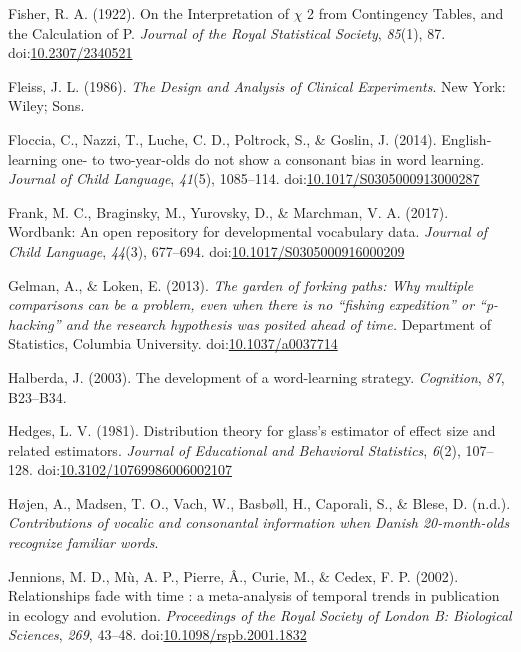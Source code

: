 \documentclass[man]{apa6}
\begin{document}
\leavevmode\hypertarget{ref-Fisher1922}{}%
Fisher, R. A. (1922). On the Interpretation of \(\chi\) 2 from Contingency Tables, and the Calculation of P. \emph{Journal of the Royal Statistical Society}, \emph{85}(1), 87. doi:\href{https://doi.org/10.2307/2340521}{10.2307/2340521}

\leavevmode\hypertarget{ref-Fleiss1986}{}%
Fleiss, J. L. (1986). \emph{The Design and Analysis of Clinical Experiments}. New York: Wiley; Sons.

\leavevmode\hypertarget{ref-Floccia2014}{}%
Floccia, C., Nazzi, T., Luche, C. D., Poltrock, S., \& Goslin, J. (2014). English-learning one- to two-year-olds do not show a consonant bias in word learning. \emph{Journal of Child Language}, \emph{41}(5), 1085--114. doi:\href{https://doi.org/10.1017/S0305000913000287}{10.1017/S0305000913000287}

\leavevmode\hypertarget{ref-Frank2017}{}%
Frank, M. C., Braginsky, M., Yurovsky, D., \& Marchman, V. A. (2017). Wordbank: An open repository for developmental vocabulary data. \emph{Journal of Child Language}, \emph{44}(3), 677--694. doi:\href{https://doi.org/10.1017/S0305000916000209}{10.1017/S0305000916000209}

\leavevmode\hypertarget{ref-Gelman2013}{}%
Gelman, A., \& Loken, E. (2013). \emph{The garden of forking paths: Why multiple comparisons can be a problem, even when there is no ``fishing expedition'' or ``p-hacking'' and the research hypothesis was posited ahead of time.} Department of Statistics, Columbia University. doi:\href{https://doi.org/10.1037/a0037714}{10.1037/a0037714}

\leavevmode\hypertarget{ref-Halberda2003}{}%
Halberda, J. (2003). The development of a word-learning strategy. \emph{Cognition}, \emph{87}, B23--B34.

\leavevmode\hypertarget{ref-Hedges1981}{}%
Hedges, L. V. (1981). Distribution theory for glass's estimator of effect size and related estimators. \emph{Journal of Educational and Behavioral Statistics}, \emph{6}(2), 107--128. doi:\href{https://doi.org/10.3102/10769986006002107}{10.3102/10769986006002107}

\leavevmode\hypertarget{ref-Hojen}{}%
Højen, A., Madsen, T. O., Vach, W., Basbøll, H., Caporali, S., \& Blese, D. (n.d.). \emph{Contributions of vocalic and consonantal information when Danish 20-month-olds recognize familiar words}.

\leavevmode\hypertarget{ref-Jennions2002}{}%
Jennions, M. D., Mù, A. P., Pierre, Â., Curie, M., \& Cedex, F. P. (2002). Relationships fade with time : a meta-analysis of temporal trends in publication in ecology and evolution. \emph{Proceedings of the Royal Society of London B: Biological Sciences}, \emph{269}, 43--48. doi:\href{https://doi.org/10.1098/rspb.2001.1832}{10.1098/rspb.2001.1832}
\end{document}
